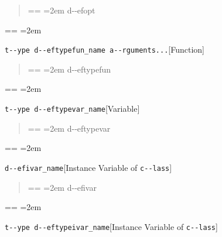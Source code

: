 \documentclass{book}
\makeatletter
\newenvironment{GNUTexinfopreformatted}{%
  \par\obeylines\obeyspaces\frenchspacing
  \parskip=\z@\parindent=\z@}{}
\makeatother
\begin{document}
%
\begin{quote}
\unskip{\parskip=0pt\noindent}%
\begin{GNUTexinfopreformatted}
\leftskip=2em\relax\ttfamily%
d{-}{-}efopt
\end{GNUTexinfopreformatted}
\end{quote}
\begin{GNUTexinfopreformatted}
\leftskip=2em\relax\ttfamily%

\end{GNUTexinfopreformatted}
\noindent\texttt{t{-}{-}ype d{-}{-}eftypefun\_name a{-}{-}rguments...}\hfill[Function]

%
\begin{quote}
\unskip{\parskip=0pt\noindent}%
\begin{GNUTexinfopreformatted}
\leftskip=2em\relax\ttfamily%
d{-}{-}eftypefun
\end{GNUTexinfopreformatted}
\end{quote}
\begin{GNUTexinfopreformatted}
\leftskip=2em\relax\ttfamily%

\end{GNUTexinfopreformatted}
\noindent\texttt{t{-}{-}ype d{-}{-}eftypevar\_name}\hfill[Variable]

%
\begin{quote}
\unskip{\parskip=0pt\noindent}%
\begin{GNUTexinfopreformatted}
\leftskip=2em\relax\ttfamily%
d{-}{-}eftypevar
\end{GNUTexinfopreformatted}
\end{quote}
\begin{GNUTexinfopreformatted}
\leftskip=2em\relax\ttfamily%

\end{GNUTexinfopreformatted}
\noindent\texttt{d{-}{-}efivar\_name}\hfill[Instance Variable of \texttt{c{-}{-}lass}]

%
\begin{quote}
\unskip{\parskip=0pt\noindent}%
\begin{GNUTexinfopreformatted}
\leftskip=2em\relax\ttfamily%
d{-}{-}efivar
\end{GNUTexinfopreformatted}
\end{quote}
\begin{GNUTexinfopreformatted}
\leftskip=2em\relax\ttfamily%

\end{GNUTexinfopreformatted}
\noindent\texttt{t{-}{-}ype d{-}{-}eftypeivar\_name}\hfill[Instance Variable of \texttt{c{-}{-}lass}]
\end{document}
